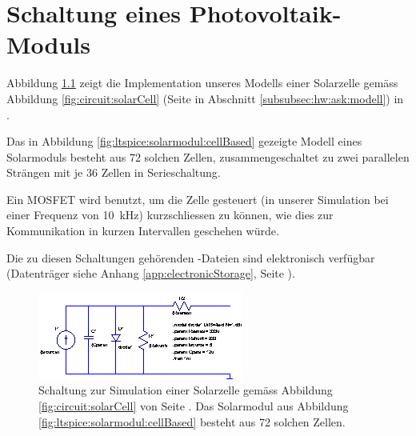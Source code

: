 \chapter{ Schaltung eines Photovoltaik-Moduls}
\label{app:simu:module}

Abbildung \ref{fig:ltspice:solarCell} zeigt die Implementation unseres Modells
einer   Solarzelle  gem\"ass   Abbildung  \ref{fig:circuit:solarCell}   (Seite
\pageref{fig:circuit:solarCell} in Abschnitt \ref{subsubsec:hw:ask:modell}) in
.

Das in Abbildung  \ref{fig:ltspice:solarmodul:cellBased} gezeigte Modell eines
Solarmoduls  besteht  aus  72   solchen  Zellen,  zusammengeschaltet  zu  zwei
parallelen Str\"angen mit je 36 Zellen in Serieschaltung.

Ein MOSFET  wird benutzt, um  die Zelle  gesteuert (in unserer  Simulation bei
einer Frequenz von \SI{10}{\kilo\hertz})  kurzschliessen zu k\"onnen, wie dies
zur Kommunikation in kurzen Intervallen geschehen w\"urde.

Die zu  diesen Schaltungen geh\"orenden -Dateien  sind elektronisch
verf\"ugbar  (Datentr\"ager  siehe Anhang  \ref{app:electronicStorage},  Seite
\pageref{app:electronicStorage}).


\begin{figure}[h!tb]
    \centering
    \includegraphics[width=\textwidth]{images/ltspice/singlecell.eps}
    \caption{%
        Schaltung     zur     Simulation     einer     Solarzelle     gem\"ass
        Abbildung         \ref{fig:circuit:solarCell}        von         Seite
        \pageref{fig:circuit:solarCell}. Das    Solarmodul    aus    Abbildung
        \ref{fig:ltspice:solarmodul:cellBased} besteht aus 72 solchen Zellen.
    }
    \label{fig:ltspice:solarCell}
\end{figure}

